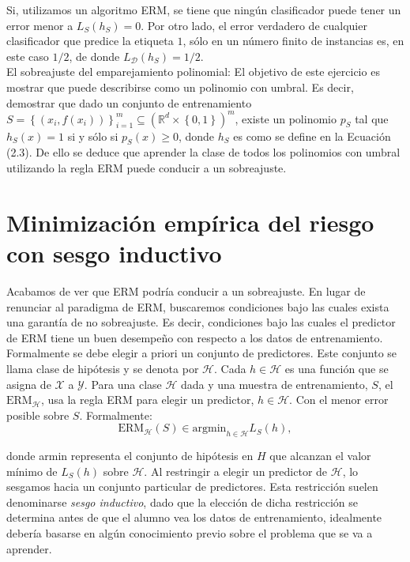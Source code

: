 Si, utilizamos un algoritmo ERM, se tiene que ningún clasificador puede tener un error menor a $L_S(h_S)=0$. Por otro lado, el error verdadero de cualquier clasificador que predice la etiqueta $1$, sólo en un número finito de instancias es, en este caso $1/2$, de donde $L_{\mathcal{D}}(h_S)=1/2$.\\

El sobreajuste del emparejamiento polinomial: El objetivo de este ejercicio es mostrar que puede describirse como un polinomio con umbral. Es decir, demostrar que dado un conjunto de entrenamiento $S = \left\{(x_i, f(x_i))\right\}^{m}_{i=1}  \subseteq (\mathbb{R}^d \times \left\{0, 1\right\})^m$, existe un polinomio $p_S$ tal que $h_S(x) = 1$ si y sólo si $p_S(x) \geq 0$, donde $h_S$ es como se define en la Ecuación (2.3). De ello se deduce que aprender la clase de todos los polinomios con umbral utilizando la regla ERM puede conducir a un sobreajuste.

\section{Minimización empírica del riesgo con sesgo inductivo}

Acabamos de ver que ERM podría conducir a un sobreajuste. En lugar de renunciar al paradigma de ERM, buscaremos condiciones bajo las cuales exista una garantía de no sobreajuste. Es decir, condiciones bajo las cuales el predictor de ERM tiene un buen desempeño con respecto a los datos de entrenamiento.\\

Formalmente se debe elegir a priori un conjunto de predictores. Este conjunto se llama clase de hipótesis y se denota por $\mathcal{H}$. Cada $h\in \mathcal{H}$ es una función que se asigna de $\mathcal{X}$ a $\mathcal{Y}$. Para una clase $\mathcal{H}$ dada y una muestra de entrenamiento, $S$, el $\text{ERM}_{\mathcal{H}}$, usa la regla ERM para elegir un predictor, $h\in \mathcal{H}$. Con el menor error posible sobre $S$. Formalmente:
$$\text{ERM}_{\mathcal{H}}(S) \in \text{argmin}_{h\in \mathcal{H}} L_S(h),$$

donde armin representa el conjunto de hipótesis en $H$ que alcanzan el valor mínimo de $L_S(h)$ sobre $\mathcal{H}$. Al restringir a elegir un predictor de $\mathcal{H}$, lo sesgamos hacia un conjunto particular de predictores. Esta restricción suelen denominarse \textit{sesgo inductivo}, dado que la elección de dicha restricción se determina antes de que el alumno vea los datos de entrenamiento, idealmente debería basarse en algún conocimiento previo sobre el problema que se va a aprender.\\

